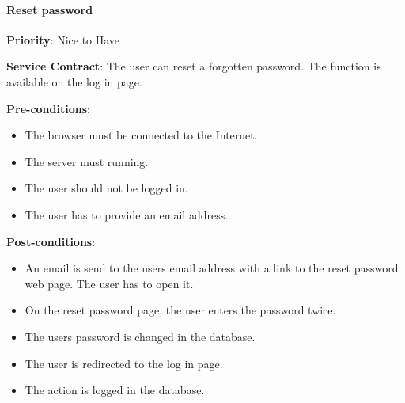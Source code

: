     	\paragraph{Reset password}
			\begin{description}
			    \item{\textbf{Priority}:} Nice to Have
			    \item{\textbf{Service Contract}:} The user can reset a forgotten password. The function is available on the log in page. 
			    \item{\textbf{Pre-conditions}:}
    			    \begin{itemize}
    			        \item The browser must be connected to the Internet.
    			        \item The server must running. 	
    			        \item The user should not be logged in. 
    			        \item The user has to provide an email address.
    			    \end{itemize}
			    \item{\textbf{Post-conditions}:} 
    			    \begin{itemize}
    			      \item An email is send to the users email address with a link to the reset password web page. The user has to open it.
    			      \item On the reset password page, the user enters the password twice.
    			      \item The users password is changed in the database.
    			      \item The user is redirected to the log in page.
    			      \item  The action is logged in the database.
    			    \end{itemize}
			\end{description}
							
			
